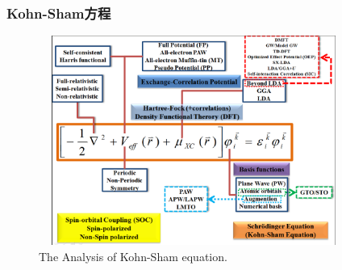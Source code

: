 \documentclass[cjk,slidestop,compress,mathserif,blue]{beamer}
\begin{document}
\frame                               %
{
	\frametitle{\textrm{Kohn-Sham}方程}
\begin{figure}[h!]
\centering
\vspace*{-0.21in}
\hspace*{-0.1in}
\includegraphics[height=2.7in,width=4.0in,viewport=2 5 1162 880,clip]{Figures/DFT.png}
\caption{\small \textrm{The Analysis of Kohn-Sham equation.}}%
\label{DFT}
\end{figure}
}

\end{document}
